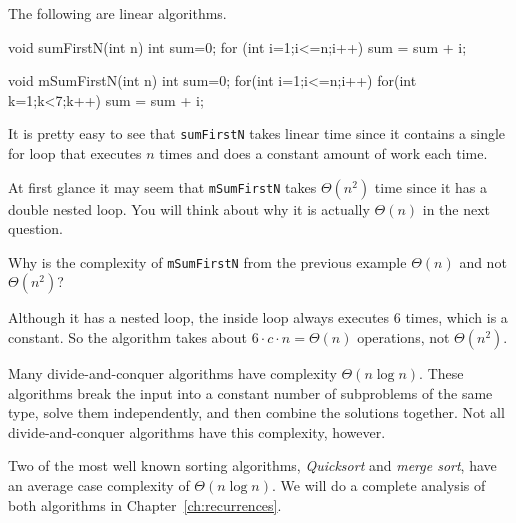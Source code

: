 \begin{exa}
The following are linear algorithms.
\medskip

\noindent
\begin{minipage}{.45\textwidth}
\begin{code}
  void sumFirstN(int n) {
      int sum=0; 
      for (int i=1;i<=n;i++)
      sum = sum + i;  
  }
\end{code}
\end{minipage}
\hfill
\begin{minipage}{.45\textwidth}
\begin{code}
  void mSumFirstN(int n) {
      int sum=0;
      for(int i=1;i<=n;i++)
          for(int k=1;k<7;k++)
              sum = sum + i;
  }
\end{code} 
\end{minipage}

It is pretty easy to see that \verb+sumFirstN+ takes linear time since it contains a
single for loop that executes $n$ times and does a constant amount of work each time.

At first glance it may seem that \verb+mSumFirstN+ takes $\Theta(n^2)$ time since it
has a double nested loop.  You will think about why it is actually $\Theta(n)$ in 
the next question.
\end{exa}

\begin{ques}
Why is the complexity of \verb+mSumFirstN+ from the previous example
$\Theta(n)$ and not $\Theta(n^2)$?

\noindent
\answerlinethree
\begin{answer}
Although it has a nested loop, the inside loop always executes $6$ times, which
is a constant.  So the algorithm takes about $6\cdot c\cdot n=\Theta(n)$ operations, not $\Theta(n^2)$.
\end{answer}
\end{ques}


\begin{df}[$n \log n$]
Many divide-and-conquer algorithms have complexity $\Theta(n\log n)$.
These algorithms break the input into a constant number
of subproblems of the same type, solve them independently, and then
combine the solutions together.  Not all divide-and-conquer algorithms
have this complexity, however.
\end{df}

\begin{exa}
Two of the most well known sorting algorithms, {\em Quicksort} and {\em merge sort}, 
have an average case complexity of $\Theta(n\log n)$.  
We will do a complete analysis of both algorithms in Chapter~\ref{ch:recurrences}.
\end{exa}

